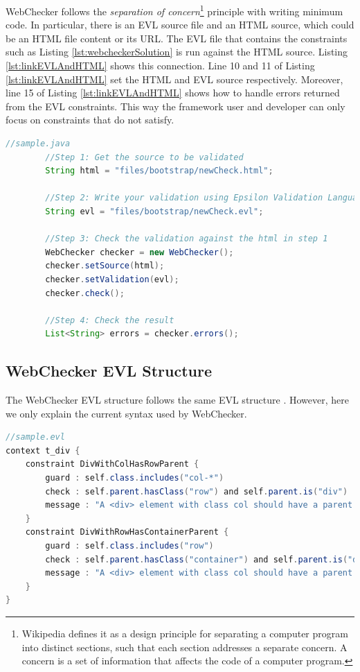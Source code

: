 \documentclass[conference]{IEEETran}
\begin{document}
WebChecker follows the \textit{separation of concern}\footnote{Wikipedia defines it as a design principle for separating a computer program into distinct sections, such that each section addresses a separate concern. A concern is a set of information that affects the code of a computer program.} principle with writing minimum code. In particular, there is an EVL source file and an HTML source, which could be an HTML file content or its URL. The EVL file that contains the constraints such as Listing \ref{lst:webcheckerSolution} is run against the HTML source. Listing \ref{lst:linkEVLAndHTML} shows this connection. Line 10 and 11 of Listing \ref{lst:linkEVLAndHTML} set the HTML and EVL source respectively. Moreover, line 15 of Listing \ref{lst:linkEVLAndHTML} shows how to handle errors returned from the EVL constraints. This way the framework user and developer can only focus on constraints that do not satisfy.   

\begin{lstlisting}[language=Java, caption=Checking an EVL file against an HTML source file, label={lst:linkEVLAndHTML}]
 	//sample.java    
		//Step 1: Get the source to be validated
		String html = "files/bootstrap/newCheck.html";
		
		//Step 2: Write your validation using Epsilon Validation Language
		String evl = "files/bootstrap/newCheck.evl";
		
		//Step 3: Check the validation against the html in step 1
		WebChecker checker = new WebChecker();
		checker.setSource(html);
		checker.setValidation(evl);
		checker.check();
		
		//Step 4: Check the result
		List<String> errors = checker.errors();


\end{lstlisting}

\subsection{WebChecker EVL Structure}
The WebChecker EVL structure follows the same EVL structure \cite{Kolovos2009}. However, here we only explain the current syntax used by WebChecker. 


\begin{lstlisting}[language=Java, caption=Enforcing Bootstrap Grid Rule by Using WebChecker, label={lst:webcheckerSolution}]
//sample.evl
context t_div { 
    constraint DivWithColHasRowParent {
        guard : self.class.includes("col-*")
        check : self.parent.hasClass("row") and self.parent.is("div")
        message : "A <div> element with class col should have a parent <div> element with class row."
    }
    constraint DivWithRowHasContainerParent {
        guard : self.class.includes("row")
        check : self.parent.hasClass("container") and self.parent.is("div")
        message : "A <div> element with class col should have a parent <div> element with class row."
    }
}

\end{lstlisting}
\end{document}
